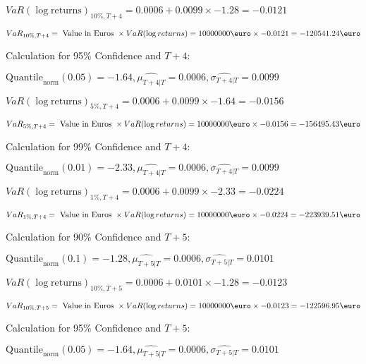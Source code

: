 \indent\indent $VaR(\log \text{returns})_{10\%, T + 4} = 0.0006 + 0.0099\times-1.28 = -0.0121$

\indent\indent $VaR_{10\%, T + 4} = \text{ Value in Euros } \times VaR(\log returns) = 10 000 000 \text{\euro} \times-0.0121 = -120541.24 \text{\euro}$\newline




Calculation for 95\% Confidence and $T+4$:

\indent\indent $\text{Quantile}_\text{norm}(0.05) = -1.64,\hat{\mu_{T+4|T}} = 0.0006, \hat{\sigma_{T+4|T}} = 0.0099$

\indent\indent $VaR(\log \text{returns})_{5\%, T + 4} = 0.0006 + 0.0099\times-1.64 = -0.0156$

\indent\indent $VaR_{5\%, T + 4} = \text{ Value in Euros } \times VaR(\log returns) = 10 000 000 \text{\euro} \times-0.0156 = -156495.43 \text{\euro}$\newline




Calculation for 99\% Confidence and $T+4$:

\indent\indent $\text{Quantile}_\text{norm}(0.01) = -2.33,\hat{\mu_{T+4|T}} = 0.0006, \hat{\sigma_{T+4|T}} = 0.0099$

\indent\indent $VaR(\log \text{returns})_{1\%, T + 4} = 0.0006 + 0.0099\times-2.33 = -0.0224$

\indent\indent $VaR_{1\%, T + 4} = \text{ Value in Euros } \times VaR(\log returns) = 10 000 000 \text{\euro} \times-0.0224 = -223939.51 \text{\euro}$\newline




Calculation for 90\% Confidence and $T+5$:

\indent\indent $\text{Quantile}_\text{norm}(0.1) = -1.28,\hat{\mu_{T+5|T}} = 0.0006, \hat{\sigma_{T+5|T}} = 0.0101$

\indent\indent $VaR(\log \text{returns})_{10\%, T + 5} = 0.0006 + 0.0101\times-1.28 = -0.0123$

\indent\indent $VaR_{10\%, T + 5} = \text{ Value in Euros } \times VaR(\log returns) = 10 000 000 \text{\euro} \times-0.0123 = -122596.95 \text{\euro}$\newline




Calculation for 95\% Confidence and $T+5$:

\indent\indent $\text{Quantile}_\text{norm}(0.05) = -1.64,\hat{\mu_{T+5|T}} = 0.0006, \hat{\sigma_{T+5|T}} = 0.0101$

